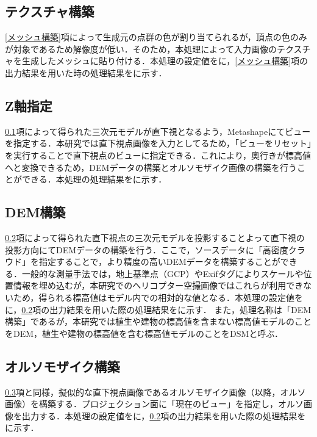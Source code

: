    \subsection{テクスチャ構築}
      \label{テクスチャ構築}
      \ref{メッシュ構築}項によって生成元の点群の色が割り当てられるが，頂点の色のみが対象であるため解像度が低い．そのため，本処理によって入力画像のテクスチャを生成したメッシュに貼り付ける．本処理の設定値を\fref{}に，\ref{メッシュ構築}項の出力結果を用いた時の処理結果を\fref{}に示す．

    \subsection{Z軸指定}
      \label{Z軸指定}
      \ref{テクスチャ構築}項によって得られた三次元モデルが直下視となるよう，Metashapeにてビューを指定する．本研究では直下視点画像を入力としてるため，「ビューをリセット」を実行することで直下視点のビューに指定できる．これにより，奥行きが標高値へと変換できるため，DEMデータの構築とオルソモザイク画像の構築を行うことができる．本処理の処理結果を\fref{}に示す．

    \subsection{DEM構築}
      \label{DEM構築}
      \ref{Z軸指定}項によって得られた直下視点の三次元モデルを投影することよって直下視の投影方向にてDEMデータの構築を行う．ここで，ソースデータに「高密度クラウド」を指定することで，より精度の高いDEMデータを構築することができる．一般的な測量手法では，地上基準点（GCP）やExifタグによりスケールや位置情報を埋め込むが，本研究でのヘリコプター空撮画像ではこれらが利用できないため，得られる標高値はモデル内での相対的な値となる．本処理の設定値を\fref{}に，\ref{Z軸指定}項の出力結果を用いた際の処理結果を\fref{}に示す．
      また，処理名称は「DEM構築」であるが，本研究では植生や建物の標高値を含まない標高値モデルのことをDEM，植生や建物の標高値を含む標高値モデルのことをDSMと呼ぶ．

    \subsection{オルソモザイク構築}
      \label{オルソモザイク構築}
      \ref{DEM構築}項と同様，擬似的な直下視点画像であるオルソモザイク画像（以降，オルソ画像）を構築する．プロジェクション面に「現在のビュー」を指定し，オルソ画像を出力する．本処理の設定値を\fref{}に，\ref{Z軸指定}項の出力結果を用いた際の処理結果を\fref{}に示す．



